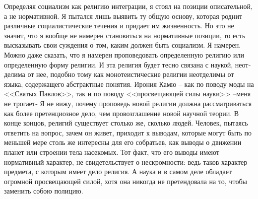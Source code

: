 \documentclass{book}
\begin{document}
Определяя социализм как религию интеграции, я стоял на позиции описательной, а не нормативной. Я пытался лишь выя­вить ту общую основу, которая роднит различные социалисти­ческие течения и придает им жизненность. Но это не значит, что я вообще не намерен становиться на нормативные позиции, то есть высказывать свои суждения о том, каким должен быть социализм. Я намерен. Можно даже сказать, что я намерен проповедовать определенную религию или определенную фор­му религии. И эта религия будет тесно связана с наукой, неот­делима от нее, подобно тому как монотеистические религии неотделимы от языка, содержащего абстрактные понятия. Ирония Камю -- как по поводу моды на <<Святых Павлов>>, так и по поводу <<просвещающей силы науки>> --меня не тро­гает‑ Я не вижу, почему проповедь новой религии должна рас­сматриваться как более претенциозное дело, чем провозглаше­ние новой научной теории. В конце концов, религий существу­ет столько же, сколько людей. Человек, пытаясь ответить на вопрос, зачем он живет, приходит к выводам, которые могут быть по меньшей мере столь же интересны для его собратьев, как выводы о движении планет или строении тела насекомых. Тот факт, что его выводы имеют нормативный характер, не сви­детельствует о нескромности: ведь таков характер предмета, с которым имеет дело религия. А наука и в самом деле обла­дает огромной просвещающей силой, хотя она никогда не пре­тендовала на то, чтобы заменить собою полицию.
\end{document}
